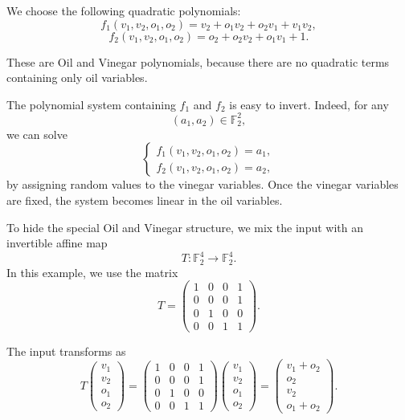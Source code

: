 \noindent
We choose the following quadratic polynomials:
\[
f_1(v_1,v_2,o_1,o_2)
=
v_2+o_1v_2+o_2v_1+v_1v_2,
\]
\[
f_2(v_1,v_2,o_1,o_2)
=
o_2+o_2v_2+o_1v_1+1.
\]

\noindent
These are Oil and Vinegar polynomials, because there are no quadratic terms
containing only oil variables.

\bigskip

\noindent
The polynomial system containing \(f_1\) and \(f_2\) is easy to invert. Indeed, for any
\[
(a_1,a_2)\in\mathbb F_2^2,
\]
we can solve
\[
\begin{cases}
f_1(v_1,v_2,o_1,o_2)=a_1,\\
f_2(v_1,v_2,o_1,o_2)=a_2,
\end{cases}
\]
by assigning random values to the vinegar variables. Once the vinegar variables are fixed, the system becomes linear in the oil variables.

\bigskip

\noindent
To hide the special Oil and Vinegar structure, we mix the input with an invertible affine map
\[
T:\mathbb F_2^4\to\mathbb F_2^4.
\]
In this example, we use the matrix
\[
T=
\begin{pmatrix}
1 & 0 & 0 & 1\\
0 & 0 & 0 & 1\\
0 & 1 & 0 & 0\\
0 & 0 & 1 & 1
\end{pmatrix}.
\]

\noindent
The input transforms as
\[
T
\begin{pmatrix}
v_1\\
v_2\\
o_1\\
o_2
\end{pmatrix}
=
\begin{pmatrix}
1 & 0 & 0 & 1\\
0 & 0 & 0 & 1\\
0 & 1 & 0 & 0\\
0 & 0 & 1 & 1
\end{pmatrix}
\begin{pmatrix}
v_1\\
v_2\\
o_1\\
o_2
\end{pmatrix}
=
\begin{pmatrix}
v_1+o_2\\
o_2\\
v_2\\
o_1+o_2
\end{pmatrix}.
\]

